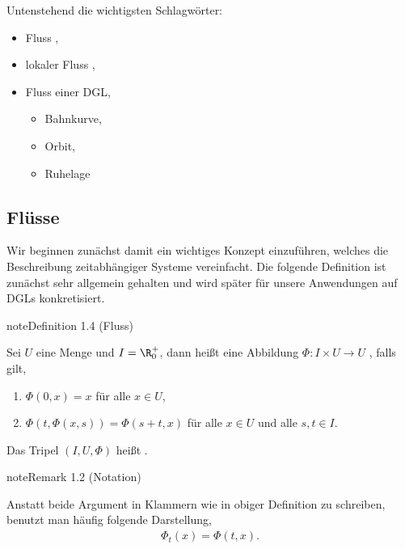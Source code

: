 \documentclass[letterpaper,10pt,english]{jupyterBook}
\begin{document}
Untenstehend die wichtigsten Schlagwörter:
\begin{itemize}
\item {} 
Fluss {\hyperref[\detokenize{ode/fluesse:def:Fluss}]{}},

\item {} 
lokaler Fluss {\hyperref[\detokenize{ode/fluesse:def:LokFluss}]{}},

\item {} 
Fluss einer DGL,
\begin{itemize}
\item {} 
Bahnkurve,

\item {} 
Orbit,

\item {} 
Ruhelage

\end{itemize}

\end{itemize}


\subsection{Flüsse}
\label{\detokenize{ode/fluesse:flusse}}
Wir beginnen zunächst damit ein wichtiges Konzept einzuführen, welches die Beschreibung zeitabhängiger Systeme vereinfacht. Die folgende Definition ist zunächst sehr allgemein gehalten und wird später für unsere Anwendungen auf DGLs konkretisiert.
\label{ode/fluesse:def:Fluss}
\begin{sphinxadmonition}{note}{Definition 1.4 (Fluss)}



Sei \(U\) eine Menge und \(I=\R^+_0\), dann heißt eine Abbildung \(\Phi:I\times U\rightarrow U\) , falls gilt,
\begin{enumerate}
%
\item {} 
\(\Phi(0, x) = x\) für alle \(x\in U\),

\item {} 
\(\Phi(t, \Phi(x,s)) = \Phi(s + t, x)\) für alle \(x\in U\) und alle \(s,t\in I\).

\end{enumerate}

Das Tripel \((I, U, \Phi)\) heißt .
\end{sphinxadmonition}
\label{ode/fluesse:remark-1}
\begin{sphinxadmonition}{note}{Remark 1.2 (Notation)}



Anstatt beide Argument in Klammern wie in obiger Definition zu schreiben, benutzt man häufig folgende Darstellung,
\begin{equation*}
\begin{split}\Phi_t(x) = \Phi(t, x).\end{split}
\end{equation*}\end{sphinxadmonition}
\end{document}

